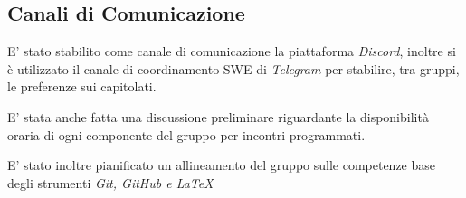 \documentclass[a4paper, 11pt]{article}
\begin{document}
\subsection{Canali di Comunicazione}

E' stato stabilito come canale di comunicazione la piattaforma \textit{Discord}, inoltre si è utilizzato il canale di coordinamento SWE di \textit{Telegram} per stabilire, tra gruppi, le preferenze sui capitolati.

E’ stata anche fatta una discussione preliminare riguardante la disponibilità oraria di ogni componente del gruppo per incontri programmati. 

E' stato inoltre pianificato un allineamento del gruppo sulle competenze base degli strumenti \textit{Git, GitHub e LaTeX}
\end{document}
